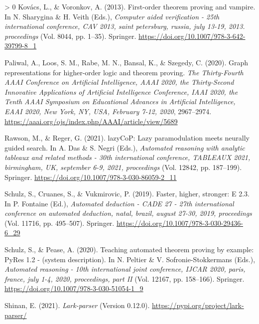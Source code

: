 \documentclass[10pt,a4paper,onecolumn]{article}
\newlength{\cslhangindent}
\newenvironment{CSLReferences}[3] %
 {%
  \setlength{\parindent}{0pt}
  \ifodd #1 \everypar{\setlength{\hangindent}{\cslhangindent}}\ignorespaces\fi
  \ifnum #2 > 0
  \setlength{\parskip}{#2\baselineskip}
  \fi
 }%
 {}
\begin{document}
\begin{CSLReferences}{1}{0}
\leavevmode\hypertarget{ref-DBLP:confux2fcavux2fKovacsV13}{}%
Kovács, L., \& Voronkov, A. (2013). First-order theorem proving and
vampire. In N. Sharygina \& H. Veith (Eds.), \emph{Computer aided
verification - 25th international conference, {CAV} 2013, saint
petersburg, russia, july 13-19, 2013. proceedings} (Vol. 8044, pp.
1--35). Springer. \url{https://doi.org/10.1007/978-3-642-39799-8_1}

\leavevmode\hypertarget{ref-DBLP:confux2faaaiux2fPaliwalLRBS20}{}%
Paliwal, A., Loos, S. M., Rabe, M. N., Bansal, K., \& Szegedy, C.
(2020). Graph representations for higher-order logic and theorem
proving. \emph{The Thirty-Fourth {AAAI} Conference on Artificial
Intelligence, {AAAI} 2020, the Thirty-Second Innovative Applications of
Artificial Intelligence Conference, {IAAI} 2020, the Tenth {AAAI}
Symposium on Educational Advances in Artificial Intelligence, {EAAI}
2020, New York, NY, USA, February 7-12, 2020}, 2967--2974.
\url{https://aaai.org/ojs/index.php/AAAI/article/view/5689}

\leavevmode\hypertarget{ref-DBLP:confux2ftableauxux2fRawsonR21}{}%
Rawson, M., \& Reger, G. (2021). lazyCoP: Lazy paramodulation meets
neurally guided search. In A. Das \& S. Negri (Eds.), \emph{Automated
reasoning with analytic tableaux and related methods - 30th
international conference, {TABLEAUX} 2021, birmingham, UK, september
6-9, 2021, proceedings} (Vol. 12842, pp. 187--199). Springer.
\url{https://doi.org/10.1007/978-3-030-86059-2_11}

\leavevmode\hypertarget{ref-DBLP:confux2fcadeux2f0001CV19}{}%
Schulz, S., Cruanes, S., \& Vukmirovic, P. (2019). Faster, higher,
stronger: {E} 2.3. In P. Fontaine (Ed.), \emph{Automated deduction -
{CADE} 27 - 27th international conference on automated deduction, natal,
brazil, august 27-30, 2019, proceedings} (Vol. 11716, pp. 495--507).
Springer. \url{https://doi.org/10.1007/978-3-030-29436-6_29}

\leavevmode\hypertarget{ref-DBLP:confux2fcadeux2f0001P20}{}%
Schulz, S., \& Pease, A. (2020). Teaching automated theorem proving by
example: PyRes 1.2 - (system description). In N. Peltier \& V.
Sofronie-Stokkermans (Eds.), \emph{Automated reasoning - 10th
international joint conference, {IJCAR} 2020, paris, france, july 1-4,
2020, proceedings, part {II}} (Vol. 12167, pp. 158--166). Springer.
\url{https://doi.org/10.1007/978-3-030-51054-1_9}

\leavevmode\hypertarget{ref-LARK}{}%
Shinan, E. (2021). \emph{Lark-parser} (Version 0.12.0).
\url{https://pypi.org/project/lark-parser/}


\end{CSLReferences}
\end{document}
